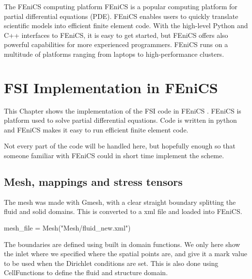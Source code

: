 \begin{comment}
\lstdefinelanguage{Python}{
 keywords={typeof, null, catch, switch, in, int, str, float, self},
 ndkeywords={boolean, throw, import},
 ndkeywords={return, class, if ,elif, endif, while, do, else, True, False , catch, def},
 ndkeywordstyle=\color{blue}\bfseries,
 identifierstyle=\color{black},
 sensitive=false,
 comment=[l]{\#},
 morecomment=[s]{/*}{*/},
 commentstyle=\color{purple}\ttfamily,
 stringstyle=\color{red}\ttfamily,
 backgroundcolor = \color{lightgray}
}
\end{comment}


The FEniCS computing platform
FEniCS is a popular computing platform for partial differential equations (PDE). FEniCS enables users to quickly translate scientific models into efficient finite element code. With the high-level Python and C++ interfaces to FEniCS, it is easy to get started, but FEniCS offers also powerful capabilities for more experienced programmers. FEniCS runs on a multitude of platforms ranging from laptops to high-performance clusters.

\chapter{FSI Implementation in FEniCS}
This Chapter shows the implementation of the FSI code in FEniCS \cite{FENICS}. FEniCS is platform used to solve partial differential equations. Code is written in python and FEniCS makes it easy to run efficient finite element code. \newline

Not every part of the code will be handled here, but hopefully enough so that someone familiar with FEniCS could in short time implement the scheme.


\section{Mesh, mappings and stress tensors}
The mesh was made with Gmesh, with a clear straight boundary splitting the fluid and solid domains. This is converted to a xml file and loaded into FEniCS. 

\begin{python}
mesh_file = Mesh("Mesh/fluid_new.xml")
\end{python}

The boundaries are defined using built in domain functions. We only here show the inlet where we specified where the spatial points are, and give it a mark value to be used when the Dirichlet conditions are set. This is also done using CellFunctions to define the fluid and structure domain. 


